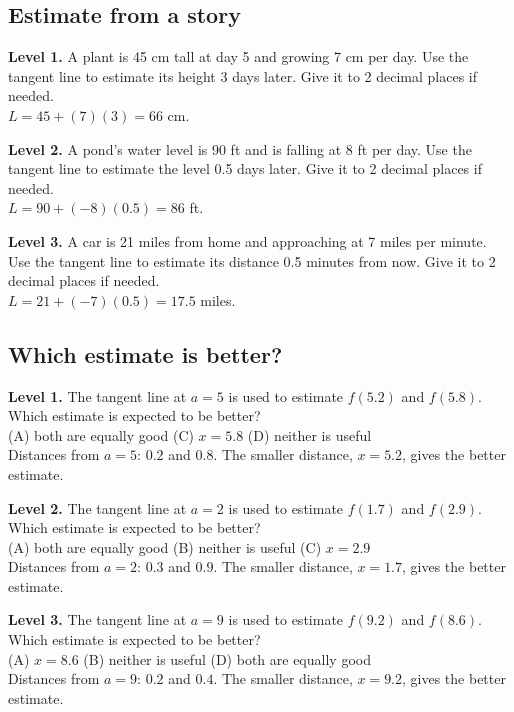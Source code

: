 \documentclass[11pt]{article}
\begin{document}
\subsection*{Estimate from a story}
\noindent\textbf{Level 1.} A plant is 45 cm tall at day 5 and growing 7 cm per day. Use the tangent line to estimate its height 3 days later. Give it to 2 decimal places if needed.\\  \quad $L=45+(7)(3)=66$ cm.\par\medskip
\noindent\textbf{Level 2.} A pond's water level is 90 ft and is falling at 8 ft per day. Use the tangent line to estimate the level 0.5 days later. Give it to 2 decimal places if needed.\\  \quad $L=90+(-8)(0.5)=86$ ft.\par\medskip
\noindent\textbf{Level 3.} A car is 21 miles from home and approaching at 7 miles per minute. Use the tangent line to estimate its distance 0.5 minutes from now. Give it to 2 decimal places if needed.\\  \quad $L=21+(-7)(0.5)=17.5$ miles.\par\medskip
\subsection*{Which estimate is better?}
\noindent\textbf{Level 1.} The tangent line at $a=5$ is used to estimate $f(5.2)$ and $f(5.8)$. Which estimate is expected to be better?\\ (A) both are equally good \quad {} \quad (C) $x=5.8$ \quad (D) neither is useful\\  \quad Distances from $a=5$: $0.2$ and $0.8$. The smaller distance, $x=5.2$, gives the better estimate.\par\medskip
\noindent\textbf{Level 2.} The tangent line at $a=2$ is used to estimate $f(1.7)$ and $f(2.9)$. Which estimate is expected to be better?\\ (A) both are equally good \quad (B) neither is useful \quad (C) $x=2.9$ \quad {}\\  \quad Distances from $a=2$: $0.3$ and $0.9$. The smaller distance, $x=1.7$, gives the better estimate.\par\medskip
\noindent\textbf{Level 3.} The tangent line at $a=9$ is used to estimate $f(9.2)$ and $f(8.6)$. Which estimate is expected to be better?\\ (A) $x=8.6$ \quad (B) neither is useful \quad {} \quad (D) both are equally good\\  \quad Distances from $a=9$: $0.2$ and $0.4$. The smaller distance, $x=9.2$, gives the better estimate.\par\medskip
\end{document}
